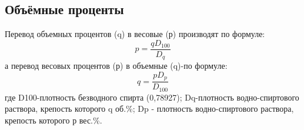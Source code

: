 \subsection{Объёмные проценты}

Перевод объемных процентов (q) в весовые (р) производят по формуле:
$$p = \frac{q D_{100}}{D_q}$$
а перевод весовых процентов (р) в объемные (q)-по формуле:
$$q = \frac{p D_p}{D_{100}}$$
где D100-плотность безводного спирта (0,78927); Dq-плотность водно-спиртового раствора, крепость которого q об.\%; Dp - плотность водно-спиртового раствора, крепость которого р вес.\%.